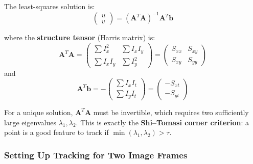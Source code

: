 \documentclass[12pt, a4paper]{article}
\begin{document}
The least-squares solution is:
\begin{equation}
  \boxed{
  \begin{pmatrix} u \\ v \end{pmatrix}
  = (\mathbf{A}^T \mathbf{A})^{-1} \mathbf{A}^T \mathbf{b}
  }
  \label{eq:lk}
\end{equation}

where the \textbf{structure tensor} (Harris matrix) is:
\[
  \mathbf{A}^T \mathbf{A} =
  \begin{pmatrix}
    \sum I_{x}^2 & \sum I_x I_y \\
    \sum I_x I_y & \sum I_y^2
  \end{pmatrix}
  = \begin{pmatrix} S_{xx} & S_{xy} \\ S_{xy} & S_{yy} \end{pmatrix}
\]
and
\[
  \mathbf{A}^T \mathbf{b} = -\begin{pmatrix}
    \sum I_x I_t \\
    \sum I_y I_t
  \end{pmatrix}
  = \begin{pmatrix} -S_{xt} \\ -S_{yt} \end{pmatrix}
\]

For a unique solution, $\mathbf{A}^T\mathbf{A}$ must be invertible, which requires two sufficiently large eigenvalues $\lambda_1, \lambda_2$.  This is exactly the \textbf{Shi--Tomasi corner criterion}: a point is a good feature to track if $\min(\lambda_1, \lambda_2) > \tau$.

\subsubsection{Setting Up Tracking for Two Image Frames}
\end{document}
